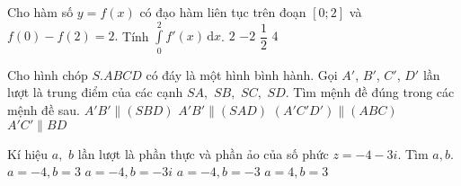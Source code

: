 \begin{ex}%
Cho hàm số $y=f(x)$ có đạo hàm liên tục trên đoạn $[0;2]$ và $f(0)-f(2)=2.$ Tính $\displaystyle\int\limits_{0}^{2} f'(x) \mathrm{\,d}x$.
\choice
{$2$}
{\True $-2$}
{$\dfrac{1}{2}$}
{$4$}

\end{ex} 
 
\begin{ex}%
Cho hình chóp $S.ABCD$ có đáy là một hình bình hành. Gọi $A'$, $B'$, $C'$, $D'$ lần lượt là trung điểm của các cạnh $SA,$ $SB,$ $SC,$ $SD.$ Tìm mệnh đề đúng trong các mệnh đề sau.
\choice
{$A'B' \parallel (SBD)$}
{$A'B' \parallel (SAD)$}
{\True $(A'C'D') \parallel (ABC)$}
{$A'C' \parallel BD$}

\end{ex} 
 
\begin{ex}%
Kí hiệu $a,$ $b$ lần lượt là phần thực và phần ảo của số phức $z=-4-3i$. Tìm $a,b$.	
\choice
{$a=-4,b=3$}
{$a=-4,b=-3i$}
{\True $a=-4,b=-3$}
{$a=4,b=3$}

\end{ex} 
 
